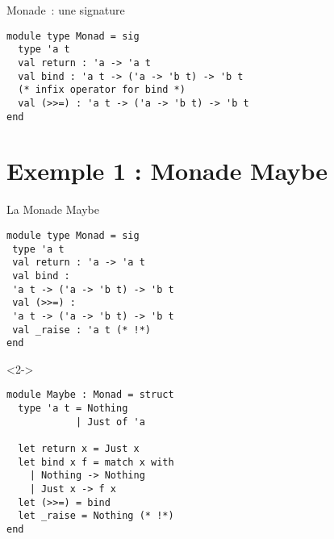 \documentclass[10pt]{beamer}
\begin{document}
\begin{frame}[fragile]{Monade~: une signature}
  \begin{verbatim}
module type Monad = sig
  type 'a t
  val return : 'a -> 'a t
  val bind : 'a t -> ('a -> 'b t) -> 'b t
  (* infix operator for bind *)
  val (>>=) : 'a t -> ('a -> 'b t) -> 'b t
end
  \end{verbatim}
\end{frame}

\section{Exemple 1 : Monade Maybe}
\begin{frame}[fragile]{La Monade Maybe}
  \begin{minipage}[c]{0.45\linewidth}
    \begin{verbatim}
module type Monad = sig
 type 'a t
 val return : 'a -> 'a t
 val bind :
 'a t -> ('a -> 'b t) -> 'b t
 val (>>=) :
 'a t -> ('a -> 'b t) -> 'b t
 val _raise : 'a t (* !*)
end
    \end{verbatim}
  \end{minipage}
  \hfill
  \begin{minipage}[c]{0.45\linewidth}
  \begin{onlyenv}<2->
    \begin{verbatim}
module Maybe : Monad = struct
  type 'a t = Nothing
            | Just of 'a

  let return x = Just x
  let bind x f = match x with
    | Nothing -> Nothing
    | Just x -> f x
  let (>>=) = bind
  let _raise = Nothing (* !*)
end
    \end{verbatim}
    \end{onlyenv}
  \end{minipage}
\end{frame}
\end{document}

